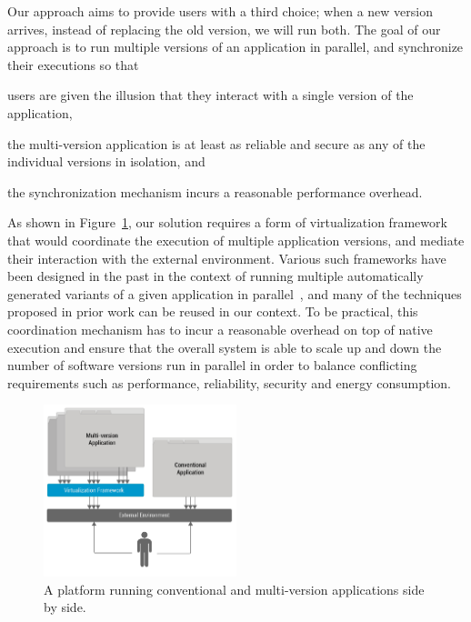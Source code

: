 Our approach aims to provide users with a third choice; when a new version
arrives, instead of replacing the old version, we will run both. The goal
of our approach is to run multiple versions of an application in parallel, and
synchronize their executions so that%
\begin{inparaenum}[(1)]
\item users are given the illusion that they interact with a single version of
  the application,
\item the multi-version application is at least as reliable and secure as any
  of the individual versions in isolation, and
\item the synchronization mechanism incurs a reasonable performance overhead.
\end{inparaenum}

As shown in Figure~\ref{fig:mx-platform}, our solution requires a form of
virtualization framework that would coordinate the execution of multiple
application versions, and mediate their interaction with the external
environment. Various such frameworks have been designed in the past in the
context of running multiple automatically generated variants of a given
application in parallel~\cite{diehard06,cox2006,orchestra09}, and many of the
techniques proposed in prior work can be reused in our context.  To be
practical, this coordination mechanism has to incur a reasonable overhead on
top of native execution and ensure that the overall system is able to scale up
and down the number of software versions run in parallel in order to balance
conflicting requirements such as performance, reliability, security and energy
consumption.

\begin{figure}[t]
  \begin{center}
    \includegraphics[width=0.5\textwidth]{multi-version/figures/platform}
    \caption{A platform running conventional and multi-version
      applications side by side.}
    \label{fig:mx-platform}
  \end{center}
\end{figure}

